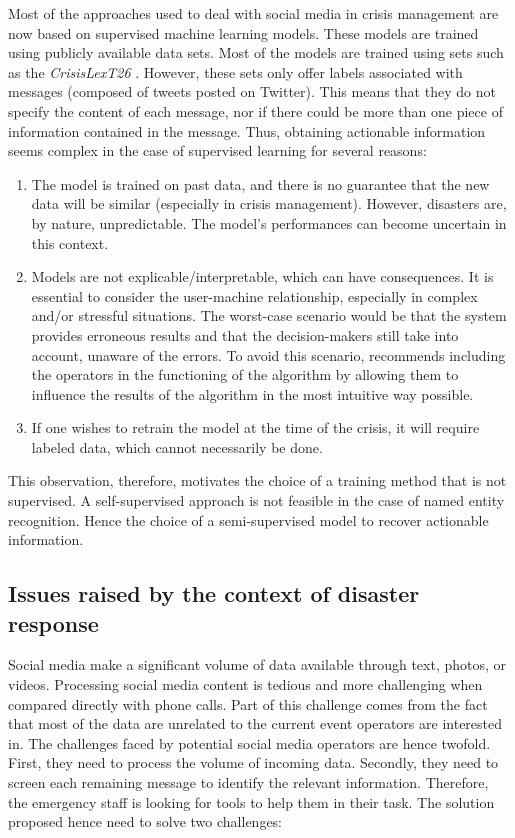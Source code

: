 Most of the approaches used to deal with social media in crisis management are now based on supervised machine learning models.
These models are trained using publicly available data sets.
Most of the models are trained using sets such as the \emph{CrisisLexT26} \parencite{olteanuCrisisLexLexiconCollecting2014,olteanuWhatExpectWhen2015}.
However, these sets only offer labels associated with messages (composed of tweets posted on Twitter).
This means that they do not specify the content of each message, nor if there could be more than one piece of information contained in the message.
Thus, obtaining actionable information seems complex in the case of supervised learning for several reasons:

\begin{enumerate}
    \item The model is trained on past data, and there is no guarantee that the new data will be similar (especially in crisis management).
          However, disasters are, by nature, unpredictable.
          The model's performances can become uncertain in this context.
    \item Models are not explicable/interpretable, which can have consequences.
          It is essential to consider the user-machine relationship, especially in complex and/or stressful situations.
          The worst-case scenario would be that the system provides erroneous results and that the decision-makers still take into account, unaware of the errors.
          To avoid this scenario, \textcite{endsleyDesigningSituationAwareness2016} recommends including the operators in the functioning of the algorithm by allowing them to influence the results of the algorithm in the most intuitive way possible.
    \item If one wishes to retrain the model at the time of the crisis, it will require labeled data, which cannot necessarily be done.
\end{enumerate}

This observation, therefore, motivates the choice of a training method that is not supervised.
A self-supervised approach is not feasible in the case of named entity recognition.
Hence the choice of a semi-supervised model to recover actionable information.

\subsection{Issues raised by the context of disaster response}
Social media make a significant volume of data available through text, photos, or videos.
Processing social media content is tedious and more challenging when compared directly with phone calls.
Part of this challenge comes from the fact that most of the data are unrelated to the current event operators are interested in.
The challenges faced by potential social media operators are hence twofold.
First, they need to process the volume of incoming data.
Secondly, they need to screen each remaining message to identify the relevant information.
Therefore, the emergency staff is looking for tools to help them in their task.
The solution proposed hence need to solve two challenges:

